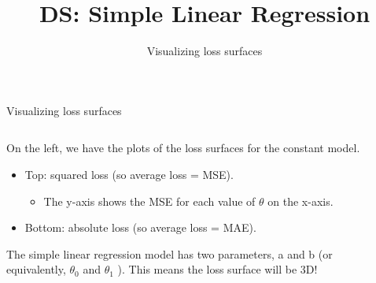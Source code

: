 \documentclass[aspectratio=169]{../latex_main/tntbeamer}  %
\title[Regression]{DS: Simple Linear Regression}
\subtitle{Visualizing loss surfaces}
\begin{document}
	
	\maketitle
	\begin{frame}{Visualizing loss surfaces}
	
	    \begin{columns}
	        \begin{column}{.55\textwidth}
	        
	                On the left, we have the plots of the loss surfaces for the constant model.
	                \begin{itemize}
	                    \item Top: squared loss (so average loss = MSE).
	                    \begin{itemize}
	                        \item The y-axis shows the MSE for each value of $\theta$ on the x-axis.
	                    \end{itemize}
	                    \item Bottom: absolute loss (so average loss = MAE).
	                \end{itemize}
	                The simple linear regression model has two parameters, a and b (or equivalently,   $\theta_0$    and    $\theta_1$    ). This means the loss surface will be 3D!

	        \end{column}
	        
	        \begin{column}{.45\textwidth}


\end{column}
\end{columns}
\end{frame}
\end{document}
